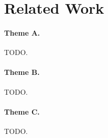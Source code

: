 %

\section{Related Work}
\label{sec:related_work}


\paragraph{Theme A.} TODO.

\paragraph{Theme B.} TODO.

\paragraph{Theme C.} TODO.
